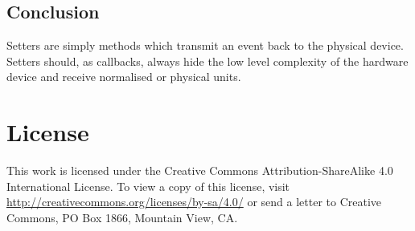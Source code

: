 \documentclass[12pt]{report}
\begin{document}
\section{Conclusion}
Setters are simply methods which transmit an event back to the physical
device. Setters should, as callbacks, always hide the low level
complexity of the hardware device and receive normalised or physical
units.


\clearpage
\appendix
\chapter{License}
This work is licensed under the Creative Commons
Attribution-ShareAlike 4.0 International License. To view a copy of
this license, visit
\url{http://creativecommons.org/licenses/by-sa/4.0/} or
send a letter to Creative Commons, PO Box 1866, Mountain View, CA.
\end{document}

